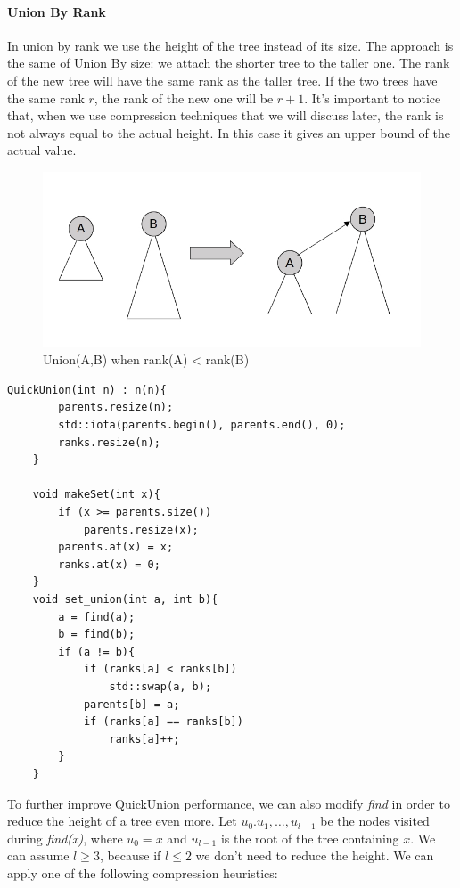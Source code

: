 \documentclass{article}
\begin{document}
\paragraph{Union By Rank} In union by rank we use the height of the tree instead
of its size. The approach is the same of Union By size: we attach the shorter tree
to the taller one. The rank of the new tree will have the same rank as the taller tree. If the two trees have the same rank $r$, the rank of the new
one will be $r+1$. It's important to notice that, when we use compression techniques that we will discuss later, the rank is not always equal to the actual height. 
In this case it gives an upper bound of the actual value.  
\begin{figure}[h!]
    \includegraphics[width=0.9\linewidth]{img/urank.png}
    \caption{Union(A,B) when rank(A) < rank(B)}
    \label{fig:urank}
\end{figure}
\begin{lstlisting}[caption=QuickUnion using Union by Rank]
    QuickUnion(int n) : n(n){
        parents.resize(n);
        std::iota(parents.begin(), parents.end(), 0);
        ranks.resize(n);
    }

    void makeSet(int x){
        if (x >= parents.size())
            parents.resize(x);
        parents.at(x) = x;
        ranks.at(x) = 0;
    }
    void set_union(int a, int b){
        a = find(a);
        b = find(b);
        if (a != b){
            if (ranks[a] < ranks[b])
                std::swap(a, b);
            parents[b] = a;
            if (ranks[a] == ranks[b])
                ranks[a]++;
        }
    }
\end{lstlisting}
To further improve QuickUnion performance, we can also modify \emph{find} in order to reduce the height of a tree
even more. Let $u_0. u_1, \dots, u_{l-1}$ be the nodes visited during \emph{find(x)}, where $u_0 = x$ and $u_{l-1}$ is
the root of the tree containing $x$. We can assume $l \geq 3$, because if $l\leq 2$ we don't need to reduce the height.
We can apply one of the following compression heuristics:
\end{document}
